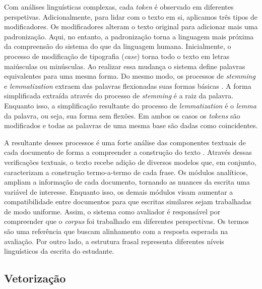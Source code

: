 Com análises linguísticas complexas, cada \textit{token} é observado em diferentes perspetivas. Adicionalmente, para lidar com o texto em si, aplicamos três tipos de modificadores. Os modificadores alteram o texto original para adicionar mais uma padronização. Aqui, no entanto, a padronização torna a linguagem mais próxima da compreensão do sistema do que da linguagem humana. Inicialmente, o processo de modificação de tipografia (\textit{case}) torna todo o texto em letras maiúsculas ou minúsculas. Ao realizar essa mudança o sistema define palavras equivalentes para uma mesma forma. Do mesmo modo, os processos de \textit{stemming} e \textit{lemmatization} extraem das palavras flexionadas suas formas básicas \cite{baeza2011}. A forma simplificada extraída através do processo de \textit{stemming} é a raiz da palavra. Enquanto isso, a simplificação resultante do processo de \textit{lemmatization} é o \textit{lemma} da palavra, ou seja, sua forma sem flexões. Em ambos os casos os \textit{tokens} são modificados e todas as palavras de uma mesma base são dadas como coincidentes.

A resultante desses processos é uma forte análise das componentes textuais de cada documento de forma a compreender a construção do texto \cite{spalenza2020}. Através dessas verificações textuais, o texto recebe adição de diversos modelos que, em conjunto, caracterizam a construção termo-a-termo de cada frase. Os módulos analíticos, ampliam a informação de cada documento, tornando as nuances da escrita uma variável de interesse. Enquanto isso, os demais módulos visam aumentar a compatibilidade entre documentos para que escritas similares sejam trabalhadas de modo uniforme. Assim, o sistema como avaliador é responsável por compreender que o \textit{corpus} foi trabalhado em diferentes perspectivas. Os termos são uma referência que buscam alinhamento com a resposta esperada na avaliação. Por outro lado, a estrutura frasal representa diferentes níveis linguísticos da escrita do estudante.

\subsection{Vetorização}
\label{subsec-vetorizacao}

